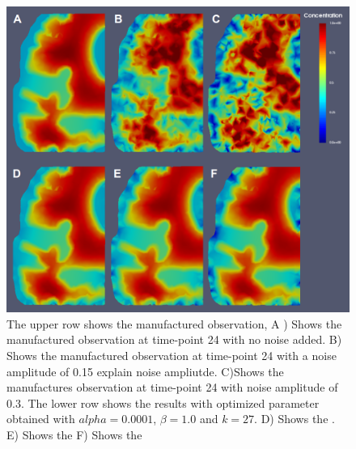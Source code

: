 \documentclass[11pt,a4paper]{article}
\begin{document}
\begin{figure}
\centering
\includegraphics[scale=0.2]{27-24-hours-scale-0-1.png}
\caption{The upper row shows the manufactured observation, A ) Shows the manufactured observation at time-point 24 with no noise added. B) Shows the manufactured observation at time-point 24 with a noise amplitude of 0.15 {\color{red} explain noise ampliutde}. C)Shows the manufactures observation at time-point 24 with noise amplitude of 0.3. The lower row shows the results with optimized parameter obtained with $alpha=0.0001$, $\beta=1.0$ and $k=27$. D) Shows the  . E)  Shows the  F)  Shows the  }
\end{figure}
 
 
 


\newpage 
{}
\end{document}
